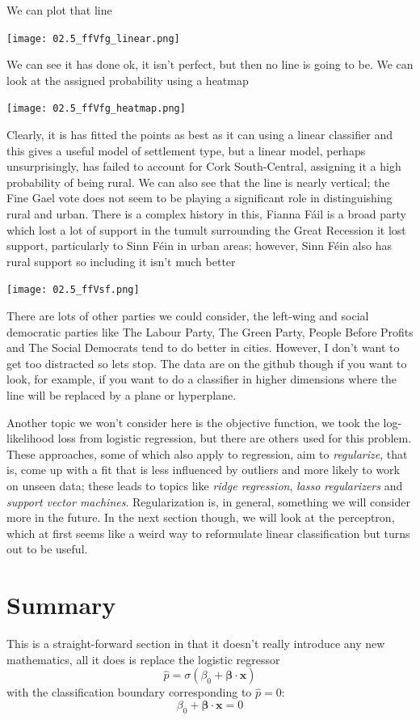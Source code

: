 \documentclass[12pt]{article}
\begin{document}
We can plot that line
\begin{center}
  \texttt{[image: 02.5\_ffVfg\_linear.png]}
\end{center}
We can see it has done ok, it isn't perfect, but then no line is going
to be. We can look at the assigned probability using a heatmap
\begin{center}
  \texttt{[image: 02.5\_ffVfg\_heatmap.png]}
\end{center}
Clearly, it is has fitted the points as best as it can using a linear
classifier and this gives a useful model of settlement type, but a
linear model, perhaps unsurprisingly, has failed to account for Cork
South-Central, assigning it a high probability of being rural. We can
also see that the line is nearly vertical; the Fine Gael vote does not
seem to be playing a significant role in distinguishing rural and
urban. There is a complex history in this, Fianna F\'{a}il is a broad
party which lost a lot of support in the tumult surrounding the Great
Recession it lost support, particularly to Sinn F\'{e}in in urban
areas; however, Sinn F\'{e}in also has rural support so including it
isn't much better
\begin{center}
  \texttt{[image: 02.5\_ffVsf.png]}
\end{center}
There are lots of other parties we could consider, the left-wing and
social democratic parties like The Labour Party, The Green Party,
People Before Profits and The Social Democrats tend to do better in
cities. However, I don't want to get too distracted so lets stop. The data are on the github though if you want
to look, for example, if you want to do a classifier in higher
dimensions where the line will be replaced by a plane or hyperplane.

Another topic we won't consider here is the objective function, we
took the log-likelihood loss from logistic regression, but there are
others used for this problem. These approaches, some of which also
apply to regression, aim to \textsl{regularize}, that is, come up with
a fit that is less influenced by outliers and more likely to work on
unseen data; these leads to topics like \textsl{ridge regression},
\textsl{lasso regularizers} and \textsl{support vector machines}.
Regularization is, in general, something we will
consider more in the future. In the next section though, we will look
at the perceptron, which at first seems like a weird way to reformulate
linear classification but turns out to be useful.

\section*{Summary}
This is a straight-forward section in that it doesn't really introduce any new mathematics, all it does is replace the logistic regressor
\begin{equation}
  \hat{p}=\sigma(\beta_0+\bm{\beta}\cdot\mathbf{x})
\end{equation}
with the classification boundary corresponding to $\hat{p}=0$:
\begin{equation}
  \beta_0+\bm{\beta}\cdot\mathbf{x}=0
\end{equation}
\end{document}
